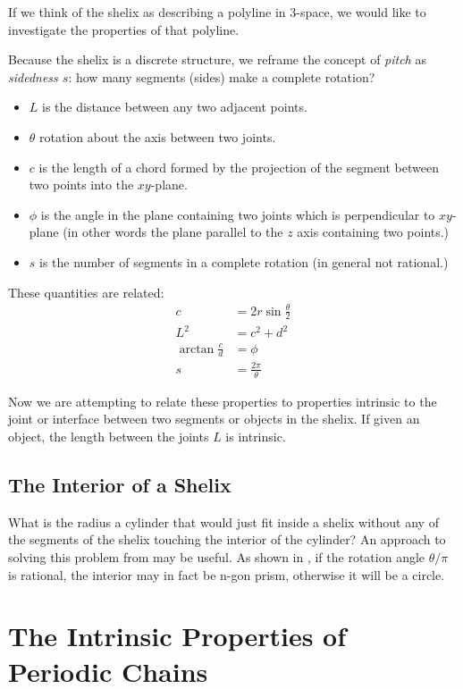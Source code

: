 \documentclass[11pt]{article}
\begin{document}
{If we think of the shelix as describing a polyline in 3-space, we would like to investigate
the properties of that polyline.

Because the shelix is a discrete structure, we reframe the concept of {\em pitch} as {\em sidedness $s$}: how many segments (sides)
make a complete rotation? 

\begin{itemize}
\item $L$ is the distance between any two adjacent points.
  \item $\theta$ rotation about the axis between two joints.
\item $c$ is the length of a chord formed by the projection of the segment between two points into the $xy$-plane.
\item $\phi$ is the angle in the plane containing two joints which is perpendicular to $xy$-plane
  (in other words the plane parallel to the $z$ axis containing two points.)
  \item $s$ is the number of segments in a complete rotation (in general not rational.)
  \end{itemize}
These quantities are related:
\begin{align}
    c &= 2r\sin{\frac{\theta}{2}} \\
    L^2 &= c^2+d^2  \\
    \arctan{\frac{c}{d}}  &= \phi \\
    s &= \frac{2 \pi}{\theta} 
\end{align}

Now we are attempting to relate these properties to properties intrinsic to the joint or interface between
two segments or objects in the shelix. If given an object, the length between the joints $L$ is intrinsic.

\subsection{The Interior of a Shelix}

What is the radius a cylinder that would just fit inside a shelix without any of the segments of the shelix
touching the interior of the cylinder? An approach to solving this problem from \cite{read2018transforming}
may be useful. As shown in \cite{read2018transforming}, if the rotation angle $\theta/\pi$ is rational, the
interior may in fact be n-gon prism, otherwise it will be a circle.

\section{The Intrinsic Properties of Periodic Chains}

}
\end{document}
